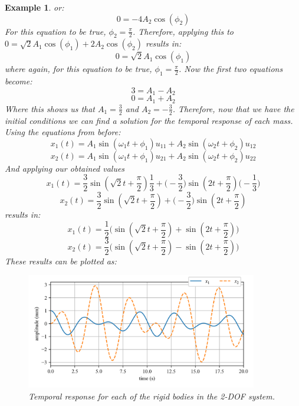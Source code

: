 \documentclass[12pt,letter]{article}
\newtheorem{ex}{Example}
\numberwithin{ex}{section} %
\newenvironment{example}{\begin{mdframed}[middlelinewidth=0.5mm]\begin{ex}\normalfont}{\end{ex}\end{mdframed}}
\numberwithin{re}{section} %
\begin{document}
\begin{example}
or:
\begin{equation}
0= - 4A_2 \cos (\phi_2)
\end{equation}
For this equation to be true, $\phi_2=\frac{\pi}{2}$. Therefore, applying this to $0= \sqrt{2}A_1 \cos (\phi_1 ) + 2A_2 \cos (\phi_2)$ results in:
\begin{equation}
0= \sqrt{2}A_1 \cos (\phi_1 )
\end{equation}
where again, for this equation to be true, $\phi_1=\frac{\pi}{2}$. Now the first two equations become:
\begin{equation}
3= A_1 - A_2 
\end{equation}
\begin{equation}
0= A_1 + A_2 
\end{equation}
Where this shows us that $A_1 = \frac{3}{2}$ and $A_2 = -\frac{3}{2}$. Therefore, now that we have the initial conditions we can find a solution for the temporal response of each mass. Using the equations from before:
\begin{equation}
	x_1(t) = A_1 \sin (\omega_1 t + \phi_1 )u_{11} + A_2 \sin (\omega_2 t + \phi_2 )u_{12}
\end{equation}
\begin{equation}
	x_2(t) = A_1 \sin (\omega_1 t + \phi_1 )u_{21} + A_2 \sin (\omega_2 t + \phi_2 )u_{22}
\end{equation}
And applying our obtained values
\begin{equation}
	x_1(t) = \frac{3}{2} \sin (\sqrt{2} t + \frac{\pi}{2} )\frac{1}{3} + \bigg(-\frac{3}{2}\bigg) \sin (2 t + \frac{\pi}{2} ) \bigg(-\frac{1}{3}\bigg)
\end{equation}
\begin{equation}
	x_2(t) = \frac{3}{2} \sin (\sqrt{2} t + \frac{\pi}{2} ) + \bigg(-\frac{3}{2}\bigg) \sin (2 t + \frac{\pi}{2} )
\end{equation}
results in:
\begin{equation}
	x_1(t) = \frac{1}{2} \bigg(  \sin (\sqrt{2} t + \frac{\pi}{2} ) + \sin (2 t + \frac{\pi}{2} ) \bigg)
\end{equation}
\begin{equation}
	x_2(t) = \frac{3}{2}  \bigg( \sin (\sqrt{2} t + \frac{\pi}{2} ) -\sin (2 t + \frac{\pi}{2} ) \bigg)
\end{equation}
These results can be plotted as:
\begin{figure}[H]
	\centering
	\includegraphics[width=0.9\textwidth]{../Figures/2-DOF_response.png}
	\caption{Temporal response for each of the rigid bodies in the 2-DOF system.}
\end{figure}
\end{example}
\end{document}
